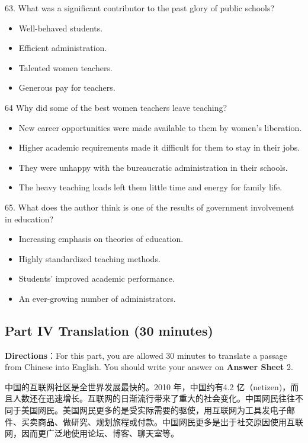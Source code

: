 \documentclass[UTF8,11pt]{ctexart}
\begin{document}
63. What was a significant contributor to the past glory of public schools?


\begin{itemize}[leftmargin=2em,itemsep=.2em,topsep=.4em]\item[A.] Well-behaved students.
\item[B.] Efficient administration.
\item[C.] Talented women teachers.
\item[D.] Generous pay for teachers.
\end{itemize}

64 Why did some of the best women teachers leave teaching?


\begin{itemize}[leftmargin=2em,itemsep=.2em,topsep=.4em]\item[A.] New career opportunities were made available to them by women’s liberation.
\item[B.] Higher academic requirements made it difficult for them to stay in their jobs.
\item[C.] They were unhappy with the bureaucratic administration in their schools.
\item[D.] The heavy teaching loads left them little time and energy for family life.
\end{itemize}

65. What does the author think is one of the results of government involvement in education?


\begin{itemize}[leftmargin=2em,itemsep=.2em,topsep=.4em]\item[A.] Increasing emphasis on theories of education.
\item[B.] Highly standardized teaching methods.
\item[C.] Students’ improved academic performance.
\item[D.] An ever-growing number of administrators.
\end{itemize}

\subsection*{\textbf{Part IV} \textbf{Translation} \textbf{(30 minutes)}}


\textbf{Directions}：For this part, you are allowed 30 minutes to translate a passage from Chinese into English. You should write your answer on\textbf{ Answer Sheet} 2.


中国的互联网社区是全世界发展最快的。2010 年，中国约有4.2 亿（netizen)，而且人数还在迅速增长。互联网的日渐流行带来了重大的社会变化。中国网民往往不同于美国网民。美国网民更多的是受实际需要的驱使，用互联网为工具发电子邮件、买卖商品、做研究、规划旅程或付款。中国网民更多是出于社交原因使用互联网，因而更广泛地使用论坛、博客、聊天室等。
\end{document}

